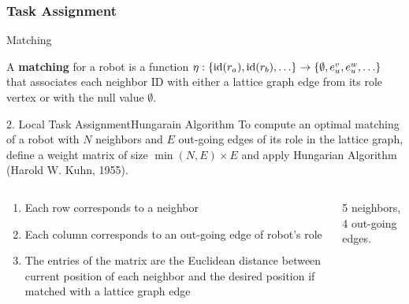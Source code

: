 \documentclass[10pt]{beamer}
\begin{document}
\subsubsection[Algorithm: Task Assignment]{Task Assignment}
\begin{frame}{Matching}{}
  \begin{definition}    
    \small{A \textbf{matching} for a robot is a function $\eta : \{{\rm id}(r_a),
      {\rm id}(r_b), \ldots \} \rightarrow \{\emptyset,e_{u}^v, e_{u}^w,
      \ldots\} $ that associates each neighbor ID with either a lattice
      graph edge from its role vertex or with the null value
      $\emptyset$.}
  \end{definition}
  \begin{center}
    
  \end{center}
\end{frame}

\begin{frame}{2. Local Task Assignment}{Hungarain Algorithm}
  To compute an optimal matching of a robot with $N$ neighbors and $E$
  out-going edges of its role in the lattice graph, define a weight
  matrix of size $\min(N,E) \times E$ and apply
  \textcolor{scred}{Hungarian Algorithm} (Harold W. Kuhn, 1955).
    \begin{columns}[T] %
      \begin{column}{.45\textwidth}
        \begin{enumerate}
        \item \small{Each row corresponds to a neighbor}
        \item \small{Each column corresponds to an out-going edge of robot's role}
        \item \small{The entries of the matrix are the Euclidean distance
          between current position of each neighbor and the desired
          position if matched with a lattice graph edge}
        \end{enumerate}
      \end{column}%
      \begin{column}{.45\textwidth}
        \vspace{3mm}
        
        \vspace{3mm}
        \begin{flushleft}
          \footnotesize{5 neighbors, 4 out-going edges.}
        \end{flushleft}
      \end{column}%
    \end{columns}
\end{frame}
\end{document}
